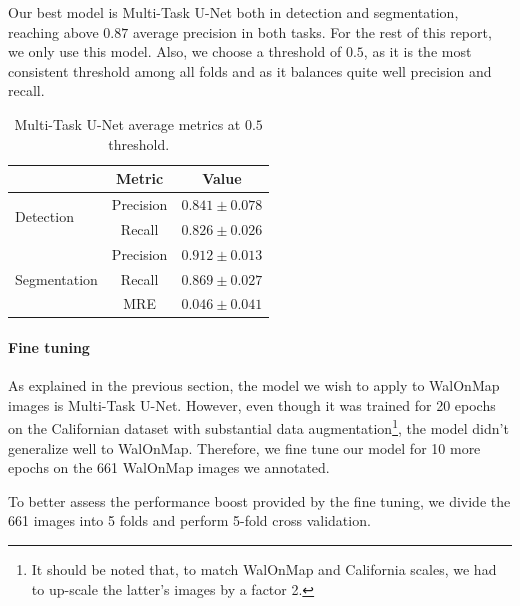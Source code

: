 \documentclass[twocolumn,superscriptaddress,aps,nofootinbib]{revtex4-1}
\begin{document}
Our best model is Multi-Task U-Net both in detection and segmentation, reaching above $0.87$ average precision in both tasks. For the rest of this report, we only use this model. Also, we choose a threshold of $0.5$, as it is the most consistent threshold among all folds and as it balances quite well precision and recall.

\begin{table}[h]
    \begin{tabular}{l|c|c}
                               & Metric       & Value \\ \hline
    \multirow{2}{*}{Detection} & Precision    & $0.841 \pm 0.078$ \\ \cline{2-3}
                               & Recall       & $0.826 \pm 0.026$ \\ \hline
    \multirow{3}{*}{Segmentation} & Precision & $0.912 \pm 0.013$ \\ \cline{2-3}
                                  & Recall    & $0.869 \pm 0.027$ \\ \cline{2-3}
                                  & MRE       & $0.046 \pm 0.041$
    \end{tabular}
    
    \caption{Multi-Task U-Net average metrics at $0.5$ threshold.}
    \label{tab:average_precision}
\end{table}

\vspace{1em}

\paragraph{Fine tuning}

As explained in the previous section, the model we wish to apply to WalOnMap images is Multi-Task U-Net. However, even though it was trained for 20 epochs on the Californian dataset with substantial data augmentation\footnote{It should be noted that, to match WalOnMap and California scales, we had to up-scale the latter's images by a factor 2.}, the model didn't generalize well to WalOnMap. Therefore, we fine tune our model for 10 more epochs on the 661 WalOnMap images we annotated.

To better assess the performance boost provided by the fine tuning, we divide the 661 images into 5 folds and perform 5-fold cross validation.
\end{document}

